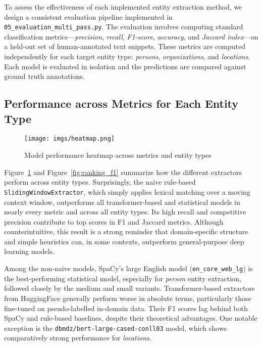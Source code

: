 To assess the effectiveness of each implemented entity extraction method, we design a consistent evaluation pipeline implemented in \texttt{05\_evaluation\_multi\_pass.py}. The evaluation involves computing standard classification metrics—\textit{precision}, \textit{recall}, \textit{F1-score}, \textit{accuracy}, and \textit{Jaccard index}—on a held-out set of human-annotated text snippets. These metrics are computed independently for each target entity type: \textit{persons}, \textit{organizations}, and \textit{locations}. Each model is evaluated in isolation and the predictions are compared against ground truth annotations.

\subsection{Performance across Metrics for Each Entity Type}

\begin{figure}[htb]
    \centering
    \texttt{[image: imgs/heatmap.png]}
    \caption{Model performance heatmap across metrics and entity types}
    \label{fig:heatmap}
\end{figure}

Figure~\ref{fig:heatmap} and Figure~\ref{fig:ranking_f1} summarize how the different extractors perform across entity types. Surprisingly, the naive rule-based \texttt{SlidingWindowExtractor}, which simply applies lexical matching over a moving context window, outperforms all transformer-based and statistical models in nearly every metric and across all entity types. Its high recall and competitive precision contribute to top scores in F1 and Jaccard metrics. Although counterintuitive, this result is a strong reminder that domain-specific structure and simple heuristics can, in some contexts, outperform general-purpose deep learning models.

Among the non-naive models, SpaCy's large English model (\texttt{en\_core\_web\_lg}) is the best-performing statistical model, especially for \textit{person} entity extraction, followed closely by the medium and small variants. Transformer-based extractors from HuggingFace generally perform worse in absolute terms, particularly those fine-tuned on pseudo-labelled in-domain data. Their F1 scores lag behind both SpaCy and rule-based baselines, despite their theoretical advantages. One notable exception is the \texttt{dbmdz/bert-large-cased-conll03} model, which shows comparatively strong performance for \textit{locations}.

